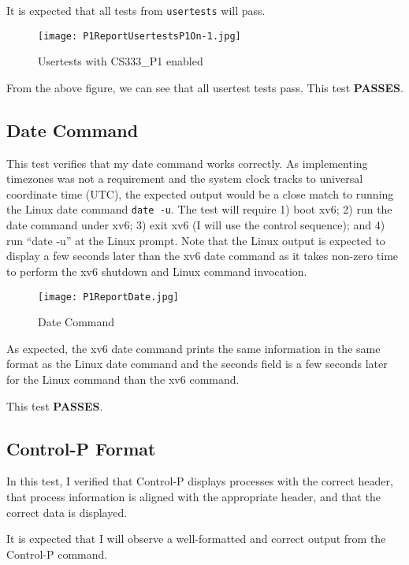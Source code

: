 \documentclass[11pt,letterpaper]{report}
\begin{document}
{  It is expected that all tests from {\tt usertests} will pass.

  \begin{figure}[h!]
    \centering
    \texttt{[image: P1ReportUsertestsP1On-1.jpg]}
    \caption[Usertests with CS333\_P1 enabled]{Usertests with CS333\_P1 enabled}
    \label{fig:usertestsp1on}
  \end{figure}

  From the above figure, we can see that all usertest tests pass. This test \textbf{PASSES}.


  \clearpage
  \subsection*{Date Command}

  This test verifies that my date command works correctly. As implementing timezones was not a requirement and the system clock tracks to
  universal coordinate time (UTC), the expected output would be a close match to running the Linux date command \texttt{date -u}. The test will require 
  1) boot xv6; 2) run the date command under xv6; 3) exit xv6 (I will use the control sequence); and 4) run ``date -u'' at the Linux prompt. Note that the Linux output is expected to display a few seconds later than the xv6 date command as it takes non-zero time to perform the xv6 shutdown and Linux command invocation.

  \begin{figure}[h!]
    \centering
    \texttt{[image: P1ReportDate.jpg]}
    \caption[Date Command]{Date Command}
    \label{fig:datecommand}
  \end{figure}

  As expected, the xv6 date command prints the same information in the same format as the Linux date command and the seconds field is a few seconds later for the Linux command than the xv6 command.

  This test \textbf{PASSES}.


  \clearpage
  \subsection*{Control-P Format}
  In this test, I verified that Control-P displays processes with the correct
  header, that process information is aligned with the appropriate header, and
  that the correct data is displayed.

  It is expected that I will observe a well-formatted and correct output from
  the Control-P command.

}
\end{document}
